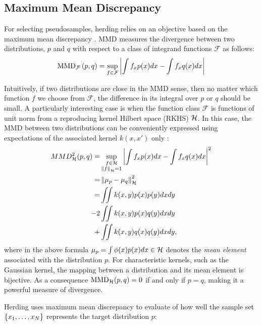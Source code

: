 \documentclass[]{article}
\begin{document}
\subsection{Maximum Mean Discrepancy}

For selecting pseudosamples, herding relies on an objective based on the maximum mean discrepancy \citep[MMD;\ ][]{Sriperumbudur2010}. MMD measures the divergence between two distributions, $p$ and $q$ with respect to a class of integrand functions $\mathcal{F}$ as follows:
%
\begin{align}
	{\rm MMD}_{\mathcal{F}}\left(p,q\right) = \sup_{f\in\mathcal{F}}\left\vert\int f_x p(x) dx - \int f_x q(x) dx \right\vert
\end{align}

Intuitively, if two distributions are close in the MMD sense, then no matter which function $f$ we choose from $\mathcal{F}$, the difference in its integral over $p$ or $q$ should be small. A particularly interesting case is when the function class $\mathcal{F}$ is functions of unit norm from a reproducing kernel Hilbert space (RKHS) $\mathcal{H}$. In this case, the MMD between two distributions can be conveniently expressed using expectations of the associated kernel $k(x, x')$ only \citep{Sriperumbudur2010}:
%
\begin{align}
MMD^2_{\mathcal{H}}(p,q) =& \sup_{\substack{f\in\mathcal{H}\\\left\|f\right\|_{\mathcal{H}}=1}}\left\vert\int f_x p(x) dx - \int f_x q(x) dx\right\vert^2\label{eqn:rkhs-mmd}\\
	=& \left\|\mu_{p} - \mu_{q}\right\|_{\mathcal{H}}^2\\
\nonumber	=&\iint k(x,y) p(x) p(y) dx dy\\
\nonumber	-2 &\iint k(x,y) p(x) q(y) dx dy\\
	+ &\iint k(x,y) q(x) q(y) dx dy,
\end{align}
%
where in the above formula $\mu_{p}=\int \phi({x})p({x})d{x}\in\mathcal{H}$ denotes the \emph{mean element} associated with the distribution $p$. For characteristic kernels, such as the Gaussian kernel, the mapping between a distribution and its mean element is bijective. As a consequence ${\rm MMD}_{\mathcal{H}}(p,q)=0$ if and only if $p=q$, making it a powerful measure of divergence.

Herding uses maximum mean discrepancy to evaluate of how well the sample set $\{{x}_1,\ldots,{x}_{N}\}$ represents the target distribution $p$:
\end{document}
